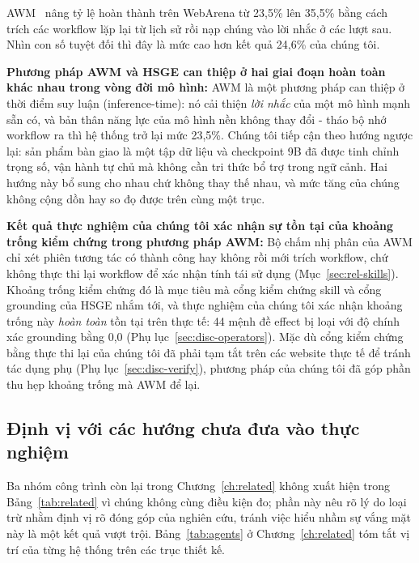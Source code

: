 AWM~\cite{wang2024awm} nâng tỷ lệ hoàn thành trên WebArena từ 23{,}5\% lên 35{,}5\% bằng cách trích các workflow lặp lại từ lịch sử rồi nạp chúng vào lời nhắc ở các lượt sau. Nhìn con số tuyệt đối thì đây là mức cao hơn kết quả 24{,}6\% của chúng tôi.

\textbf{Phương pháp AWM và HSGE can thiệp ở hai giai đoạn hoàn toàn khác nhau trong vòng đời mô hình:} AWM là một phương pháp can thiệp ở thời điểm suy luận (inference-time): nó cải thiện \emph{lời nhắc} của một mô hình mạnh sẵn có, và bản thân năng lực của mô hình nền không thay đổi - tháo bộ nhớ workflow ra thì hệ thống trở lại mức 23{,}5\%. Chúng tôi tiếp cận theo hướng ngược lại: sản phẩm bàn giao là một tập dữ liệu và checkpoint 9B đã được tinh chỉnh trọng số, vận hành tự chủ mà không cần tri thức bổ trợ trong ngữ cảnh. Hai hướng này bổ sung cho nhau chứ không thay thế nhau, và mức tăng của chúng không cộng dồn hay so đọ được trên cùng một trục.

\textbf{Kết quả thực nghiệm của chúng tôi xác nhận sự tồn tại của khoảng trống kiểm chứng trong phương pháp AWM:} Bộ chấm nhị phân của AWM chỉ xét phiên tương tác có thành công hay không rồi mới trích workflow, chứ không thực thi lại workflow để xác nhận tính tái sử dụng (Mục~\ref{sec:rel-skills}). Khoảng trống kiểm chứng đó là mục tiêu mà cổng kiểm chứng skill và cổng grounding của HSGE nhắm tới, và thực nghiệm của chúng tôi xác nhận khoảng trống này \emph{hoàn toàn} tồn tại trên thực tế: 44 mệnh đề effect bị loại với độ chính xác grounding bằng 0{,}0 (Phụ lục~\ref{sec:disc-operators}). Mặc dù cổng kiểm chứng bằng thực thi lại của chúng tôi đã phải tạm tắt trên các website thực tế để tránh tác dụng phụ (Phụ lục~\ref{sec:disc-verify}), phương pháp của chúng tôi đã góp phần thu hẹp khoảng trống mà AWM để lại.

\subsection{Định vị với các hướng chưa đưa vào thực nghiệm}
\label{sec:disc-related-qual}

Ba nhóm công trình còn lại trong Chương~\ref{ch:related} không xuất hiện trong Bảng~\ref{tab:related} vì chúng không cùng điều kiện đo; phần này nêu rõ lý do loại trừ nhằm định vị rõ đóng góp của nghiên cứu, tránh việc hiểu nhầm sự vắng mặt này là một kết quả vượt trội. Bảng~\ref{tab:agents} ở Chương~\ref{ch:related} tóm tắt vị trí của từng hệ thống trên các trục thiết kế.

